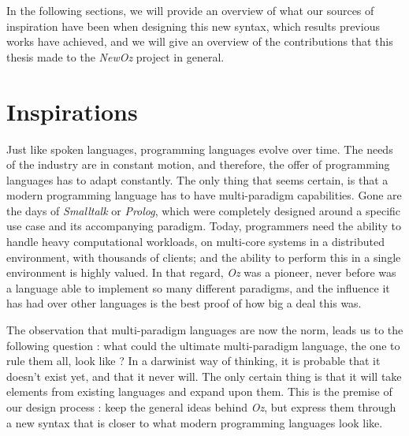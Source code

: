 In the following sections, we will provide an overview of what our sources of inspiration have been when designing this new syntax, which results previous works have achieved, and we will give an overview of the contributions that this thesis made to the \textit{NewOz} project in general.

\section{Inspirations}\label{sec:ch1-inspirations}

Just like spoken languages, programming languages evolve over time.
The needs of the industry are in constant motion, and therefore, the offer of programming languages has to adapt constantly.
The only thing that seems certain, is that a modern programming language has to have multi-paradigm capabilities.
Gone are the days of \textit{Smalltalk} or \textit{Prolog}, which were completely designed around a specific use case and its accompanying paradigm.
Today, programmers need the ability to handle heavy computational workloads, on multi-core systems in a distributed environment, with thousands of clients;
and the ability to perform this in a single environment is highly valued.
In that regard, \textit{Oz} was a pioneer, never before was a language able to implement so many different paradigms, and the influence it has had over other languages is the best proof of how big a deal this was.\newline

The observation that multi-paradigm languages are now the norm, leads us to the following question : what could the ultimate multi-paradigm language, the one to rule them all, look like ?
In a darwinist way of thinking, it is probable that it doesn't exist yet, and that it never will.
The only certain thing is that it will take elements from existing languages and expand upon them.
This is the premise of our design process : keep the general ideas behind \textit{Oz}, but express them through a new syntax that is closer to what modern programming languages look like.

